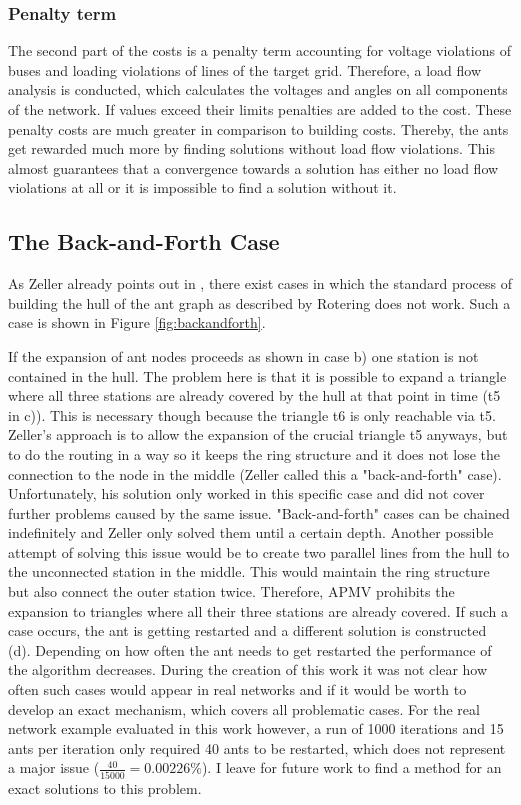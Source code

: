 \subsubsection{Penalty term}
The second part of the costs is a penalty term accounting for voltage violations of buses and loading violations of lines of the target grid. Therefore, a load flow analysis is conducted, which calculates the voltages and angles on all components of the network. If values exceed their limits penalties are added to the cost. These penalty costs are much greater in comparison to building costs. Thereby, the ants get rewarded much more by finding solutions without load flow violations. This almost guarantees that a convergence towards a solution has either no load flow violations at all or it is impossible to find a solution without it.


\subsection{The Back-and-Forth Case}\label{backandforth}
As Zeller already points out in \cite{zeller2021planung}, there exist cases in which the standard process of building the hull  of the ant graph as described by Rotering does not work. Such a case is shown in Figure \ref{fig:backandforth}.

If the expansion of ant nodes proceeds as shown in case b) one station is not contained in the hull. The problem here is that it is possible to expand a triangle where all three stations are already covered by the hull at that point in time (t5 in c)). This is necessary though because the triangle t6 is only reachable via t5. Zeller's approach is to allow the expansion of the crucial triangle t5 anyways, but to do the routing in a way so it keeps the ring structure and it does not lose the connection to the node in the middle (Zeller called this a "back-and-forth" case). Unfortunately, his solution only worked in this specific case and did not cover further problems caused by the same issue. "Back-and-forth" cases can be chained indefinitely and Zeller only solved them until a certain depth. Another possible attempt of solving this issue would be to create two parallel lines from the hull to the unconnected station in the middle. This would maintain the ring structure but also connect the outer station twice. Therefore, APMV prohibits the expansion to triangles where all their three stations are already covered. If such a case occurs, the ant is getting restarted and a different solution is constructed (d). Depending on how often the ant needs to get restarted the performance of the algorithm decreases. During the creation of this work it was not clear how often such cases would appear in real networks and if it would be worth to develop an exact mechanism, which covers all problematic cases. For the real network example evaluated in this work however, a run of 1000 iterations and 15 ants per iteration only required 40 ants to be restarted, which does not represent a major issue ($\frac{40}{15000} = 0.00226 \%$). I leave for future work to find a method for an exact solutions to this problem.

